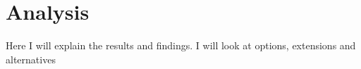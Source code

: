 \chapter{Analysis}
Here I will explain the results and findings. I will look at options, extensions and alternatives